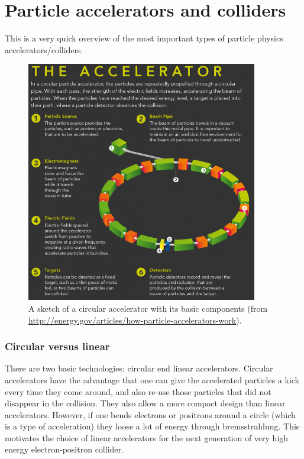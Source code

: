 \section{Particle accelerators and colliders}
This is a very quick overview of the most important types of particle physics accelerators/colliders.

\begin{figure}
\centering
\includegraphics[width=0.9\textwidth]{fig/accelerators/0_CircularAccelerator}
\caption{A sketch of a circular accelerator with its basic components (from \href{http://energy.gov/articles/how-particle-accelerators-work}{http://energy.gov/articles/how-particle-accelerators-work}).
\label{fig:my_label}}
\end{figure}

\subsubsection{Circular versus linear}
There are two basic technologies: circular end linear accelerators. Circular accelerators have the advantage that one can give the accelerated particles a kick every time they come around, and also re-use those particles that did not disappear in the collision. They also allow a more compact design than linear accelerators. However, if one bends electrons or positrons around a circle (which is a type of acceleration) they loose a lot of energy through bremsstrahlung. This motivates the choice of linear accelerators for the next generation of very high energy electron-positron collider.

